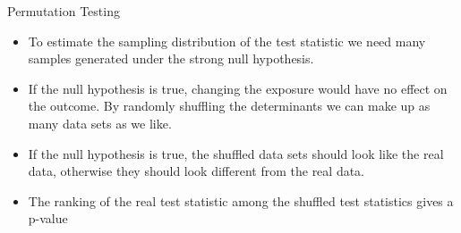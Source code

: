 \documentclass[10pt]{beamer}\usepackage[]{graphicx}\usepackage[]{color}
\begin{document}
\begin{frame}{Permutation Testing}
	\begin{itemize}
		\item To estimate the sampling distribution of the test statistic we
		need many samples generated under the strong null hypothesis.
		\item If the null hypothesis is true, changing the exposure would have
		no effect on the outcome. By randomly shuffling the determinants
		we can make up as many data sets as we like.
		\item If the null hypothesis is true, the shuffled data sets should look
		like the real data, otherwise they should look different from the real data.
		\item The ranking of the real test statistic among the shuffled test
		statistics gives a p-value
	\end{itemize}
\end{frame}
\end{document}
